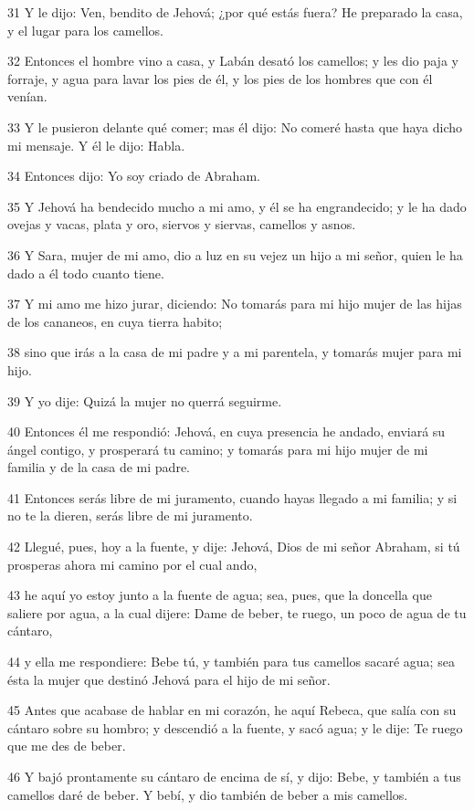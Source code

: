 \par 31 Y le dijo: Ven, bendito de Jehová; ¿por qué estás fuera? He preparado la casa, y el lugar para los camellos.
\par 32 Entonces el hombre vino a casa, y Labán desató los camellos; y les dio paja y forraje, y agua para lavar los pies de él, y los pies de los hombres que con él venían.
\par 33 Y le pusieron delante qué comer; mas él dijo: No comeré hasta que haya dicho mi mensaje. Y él le dijo: Habla.
\par 34 Entonces dijo: Yo soy criado de Abraham.
\par 35 Y Jehová ha bendecido mucho a mi amo, y él se ha engrandecido; y le ha dado ovejas y vacas, plata y oro, siervos y siervas, camellos y asnos.
\par 36 Y Sara, mujer de mi amo, dio a luz en su vejez un hijo a mi señor, quien le ha dado a él todo cuanto tiene.
\par 37 Y mi amo me hizo jurar, diciendo: No tomarás para mi hijo mujer de las hijas de los cananeos, en cuya tierra habito;
\par 38 sino que irás a la casa de mi padre y a mi parentela, y tomarás mujer para mi hijo.
\par 39 Y yo dije: Quizá la mujer no querrá seguirme.
\par 40 Entonces él me respondió: Jehová, en cuya presencia he andado, enviará su ángel contigo, y prosperará tu camino; y tomarás para mi hijo mujer de mi familia y de la casa de mi padre.
\par 41 Entonces serás libre de mi juramento, cuando hayas llegado a mi familia; y si no te la dieren, serás libre de mi juramento.
\par 42 Llegué, pues, hoy a la fuente, y dije: Jehová, Dios de mi señor Abraham, si tú prosperas ahora mi camino por el cual ando,
\par 43 he aquí yo estoy junto a la fuente de agua; sea, pues, que la doncella que saliere por agua, a la cual dijere: Dame de beber, te ruego, un poco de agua de tu cántaro,
\par 44 y ella me respondiere: Bebe tú, y también para tus camellos sacaré agua; sea ésta la mujer que destinó Jehová para el hijo de mi señor.
\par 45 Antes que acabase de hablar en mi corazón, he aquí Rebeca, que salía con su cántaro sobre su hombro; y descendió a la fuente, y sacó agua; y le dije: Te ruego que me des de beber.
\par 46 Y bajó prontamente su cántaro de encima de sí, y dijo: Bebe, y también a tus camellos daré de beber. Y bebí, y dio también de beber a mis camellos.

